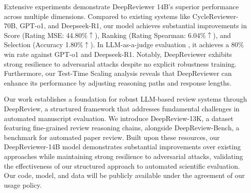 \documentclass{article}
\begin{document}
Extensive experiments demonstrate DeepReviewer 14B's superior performance across multiple dimensions. Compared to existing systems like  CycleReviewer-70B, GPT-o1, and Deepseek-R1, our model achieves substantial improvements in Score (Rating MSE: 44.80$\%\uparrow$), Ranking (Rating Spearman: 6.04$\%\uparrow$), and Selection (Accuracy 1.80$\%\uparrow$). In LLM-as-a-judge evaluation \citep{wang2024pandalm,rewina2025potential}, it achieves a 80\% win rate against GPT-o1 and Deepseek-R1. Notably, DeepReviewer exhibits strong resilience to adversarial attacks despite no explicit robustness training. Furthermore, our Test-Time Scaling analysis reveals that DeepReviewer can enhance its performance by adjusting reasoning paths and response lengths. %

Our work establishes a foundation for robust LLM-based review systems through DeepReview, a structured framework that addresses fundamental challenges in automated manuscript evaluation. We introduce DeepReview-13K, a dataset featuring fine-grained review reasoning chains, alongside DeepReview-Bench, a benchmark for automated paper review. Built upon these resources, our DeepReviewer-14B model demonstrates substantial improvements over existing approaches while maintaining strong resilience to adversarial attacks, validating the effectiveness of our structured approach to automated scientific evaluation. Our code, model, and data will be publicly available under the agreement of our usage policy.

\end{document}
